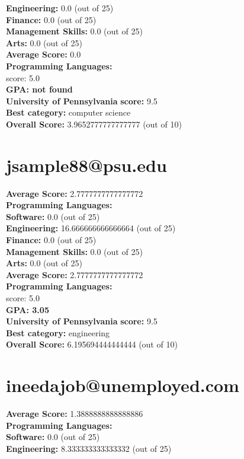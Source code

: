 \documentclass{article}
\begin{document}
    \textbf{Engineering: } 0.0 (out of 25)\\
    \textbf{Finance:} 0.0 (out of 25)\\
    \textbf{Management Skills:} 0.0 (out of 25)\\
    \textbf{Arts:} 0.0 (out of 25)\\
\textbf{Average Score: } 0.0\\
\textbf{Programming Languages:} \\
score: 5.0\\
\textbf{GPA: not found}\\
\textbf{University of Pennsylvania} \textbf{score:} 9.5\\
\textbf{Best category: } computer science\\
    \textbf{Overall Score: }3.9652777777777777 (out of 10)\section{jsample88@psu.edu}
\textbf{Average Score: } 2.7777777777777772\\
\textbf{Programming Languages:} \\
\textbf{Software:} 0.0 (out of 25)\\
    \textbf{Engineering: } 16.666666666666664 (out of 25)\\
    \textbf{Finance:} 0.0 (out of 25)\\
    \textbf{Management Skills:} 0.0 (out of 25)\\
    \textbf{Arts:} 0.0 (out of 25)\\
\textbf{Average Score: } 2.7777777777777772\\
\textbf{Programming Languages:} \\
score: 5.0\\
\textbf{GPA: 3.05}\\
\textbf{University of Pennsylvania} \textbf{score:} 9.5\\
\textbf{Best category: } engineering\\
    \textbf{Overall Score: }6.195694444444444 (out of 10)\section{ineedajob@unemployed.com}
\textbf{Average Score: } 1.3888888888888886\\
\textbf{Programming Languages:} \\
\textbf{Software:} 0.0 (out of 25)\\
    \textbf{Engineering: } 8.333333333333332 (out of 25)\\
\end{document}
